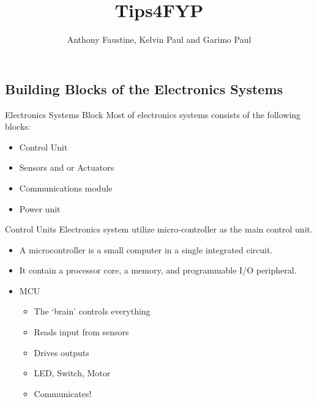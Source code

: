 \documentclass{beamer}
\title{Tips4FYP} %
\subtitle{} %
\author{Anthony Faustine, Kelvin Paul and Garimo Paul}
\begin{document}
  \frame{\maketitle}


  \begin{darkframes}
    
    \section{Building Blocks of the Electronics Systems}
    \begin{frame}[<+->]{Electronics Systems Block}
    Most of electronics systems consists of the following blocks:
    \begin{itemize}
    	\item Control Unit
    	\item Sensors and or Actuators
    	\item Communications module
    	\item Power unit
    \end{itemize}  
    \end{frame}

    \begin{frame}[<+->]{Control Units}
      Electronics system utilize micro-controller as the main control unit.
      \begin{itemize}
      	\item A microcontroller is a small computer in a single integrated circuit.
      	\item It contain a processor core, a memory, and programmable I/O peripheral.
      	\item MCU
      	\begin{itemize}
      		\item The ‘brain’ controls everything
      		\item Reads input from sensors
      		\item Drives outputs
      		\item LED, Switch, Motor
      		\item Communicates!
      	\end{itemize}
      \end{itemize}
    \end{frame}



\end{darkframes}
\end{document}
